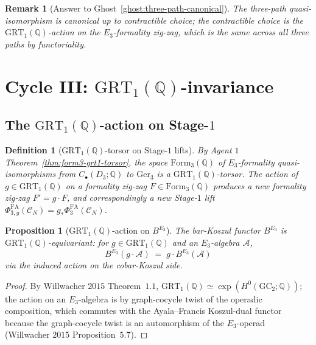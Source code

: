 \documentclass[11pt]{amsart}
\newtheorem{proposition}[theorem]{Proposition}
\newtheorem{definition}[theorem]{Definition}
\newtheorem{remark}[theorem]{Remark}
\providecommand{\Q}{\mathbb{Q}}
\providecommand{\cC}{\mathcal{C}}
\providecommand{\cA}{\mathcal{A}}
\providecommand{\GRT}{\mathrm{GRT}}
\providecommand{\PhiFA}{\Phi^{\mathrm{FA}}}
\providecommand{\Ger}{\mathrm{Ger}}
\begin{document}
\begin{remark}[Answer to Ghost~\ref{ghost:three-path-canonical}]
The three-path quasi-isomorphism is canonical up to contractible
choice; the contractible choice is the $\GRT_1(\Q)$-action on the
$E_3$-formality zig-zag, which is the same across all three paths by
functoriality.
\end{remark}

\section{Cycle III: $\GRT_1(\Q)$-invariance}
\label{sec:cycle-3-grt1-invariance}

\subsection{The $\GRT_1(\Q)$-action on Stage-$1$}

\begin{definition}[$\GRT_1(\Q)$-torsor on Stage-$1$ lifts]
\label{def:grt1-action-stage1}
By Agent $1$ Theorem~\ref{thm:form3-grt1-torsor}, the space
$\mathrm{Form}_3(\Q)$ of $E_3$-formality quasi-isomorphisms from
$C_\bullet(D_3; \Q)$ to $\Ger_3$ is a $\GRT_1(\Q)$-torsor. The
action of $g \in \GRT_1(\Q)$ on a formality zig-zag
$F \in \mathrm{Form}_3(\Q)$ produces a new formality zig-zag
$F' = g \cdot F$, and correspondingly a new Stage-$1$ lift
$\PhiFA_{3, g}(\cC_N) = g_* \PhiFA_3(\cC_N)$.
\end{definition}

\begin{proposition}[$\GRT_1(\Q)$-action on $B^{E_3}$]
\label{prop:grt1-on-B-e3}
The bar-Koszul functor $B^{E_3}$ is $\GRT_1(\Q)$-equivariant: for
$g \in \GRT_1(\Q)$ and an $E_3$-algebra $\cA$,
\[
 B^{E_3}(g \cdot \cA) \;=\; g \cdot B^{E_3}(\cA)
\]
via the induced action on the cobar-Koszul side.
\end{proposition}

\begin{proof}
By Willwacher $2015$ Theorem~$1.1$, $\GRT_1(\Q) \simeq \exp(H^0(
\mathrm{GC}_2; \Q))$; the action on an $E_3$-algebra is by
graph-cocycle twist of the operadic composition, which commutes with
the Ayala--Francis Koszul-dual functor because the graph-cocycle twist
is an automorphism of the $E_3$-operad (Willwacher $2015$
Proposition~$5.7$).
\end{proof}
\end{document}
